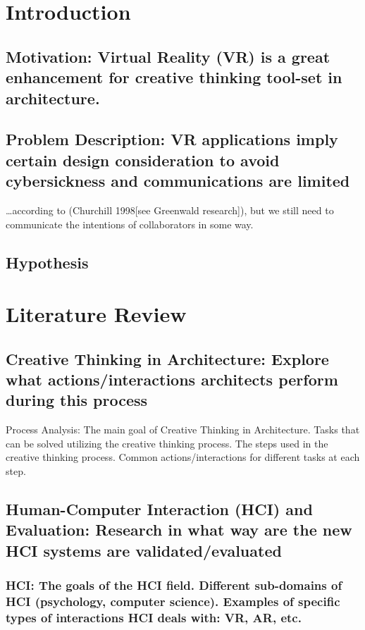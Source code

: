 
\chapter{Introduction}\label{chapter:introduction}
\section{Motivation: Virtual Reality (VR) is a great enhancement for creative thinking tool-set in architecture.}

\section{Problem Description:  VR applications imply certain design consideration to avoid cybersickness and communications are limited}
\ldots according to (Churchill 1998[see Greenwald research]), but we still need to communicate the intentions of collaborators in some way.

\section{Hypothesis}


\chapter{Literature Review}
\section{Creative Thinking in Architecture: Explore what actions/interactions architects perform during this process} %
Process Analysis: The main goal of Creative Thinking in Architecture. Tasks that can be solved utilizing the creative thinking process. The steps used in the creative thinking process. Common actions/interactions for different tasks at each step.

\section{Human-Computer Interaction (HCI) and Evaluation: Research in what way are the new HCI systems are validated/evaluated}
\subsection{HCI: The goals of the HCI field. Different sub-domains of HCI (psychology, computer science). Examples of specific types of interactions HCI deals with: VR, AR, etc.}
